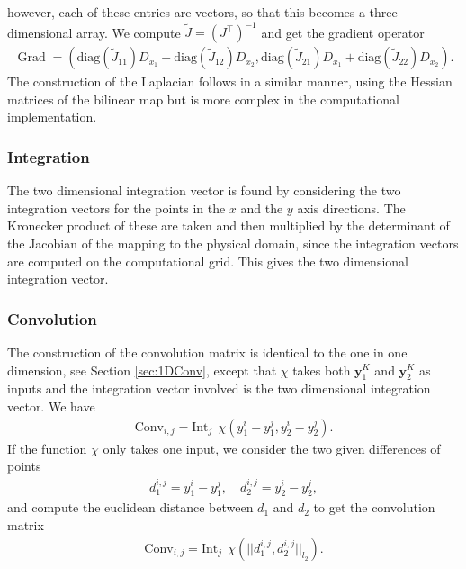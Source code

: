 \documentclass[11pt, a4paper]{article}
\theoremstyle{definition}
\DeclareMathOperator{\Grad}{Grad}
\begin{document}
however, each of these entries are  vectors, so that this becomes a three dimensional array. We compute $\tilde J = \left(J^\top\right)^{-1}$ and get the gradient operator 
\begin{align*}
	\Grad = \left( \text{diag}\left(\tilde J_{11}\right) D_{x_1} + \text{diag}\left(\tilde J_{12}\right) D_{x_2},\text{diag}\left(\tilde J_{21}\right) D_{x_1} + \text{diag}\left(\tilde J_{22}\right) D_{x_2}\right).
\end{align*}
The construction of the Laplacian follows in a similar manner, using the Hessian matrices of the bilinear map but is more complex in the computational implementation.


\subsubsection{Integration}\label{sec:2DQuadInt}
The two dimensional integration vector is found by considering the two integration vectors for the points in the $x$ and the $y$ axis directions. The Kronecker product of these are taken and then multiplied by the determinant of the Jacobian of the mapping to the physical domain, since the integration vectors are computed on the computational grid. This gives the two dimensional integration vector.

\subsubsection{Convolution}\label{sec:2DQuadConv}
The construction of the convolution matrix is identical to the one in one dimension, see Section \ref{sec:1DConv}, except that $\chi$ takes both $\mathbf{y}_1^{K}$ and $\mathbf{y}_2^{K}$ as inputs and the integration vector involved is the two dimensional integration vector.
We have
\begin{align*}
	\text{Conv}_{i,j} = \text{Int}_j \ \ \chi({y}_1^{i} - {y}_1^{j},{y}_2^{i} - {y}_2^{j}).
\end{align*}
If the function $\chi$ only takes one input, we  consider the two given differences of points 
\begin{align*}
	d_1^{i,j} = {y}_1^{i} - {y}_1^{j}, \quad
	d_2^{i,j} = {y}_2^{i} - {y}_2^{j},
\end{align*}
and compute the euclidean distance between $d_1$ and $d_2$ to get the convolution matrix
\begin{align*}
	\text{Conv}_{i,j} = \text{Int}_j \ \ \chi(||d_1^{i,j}, d_2^{i,j}||_{l_2}).
\end{align*}
\end{document}
